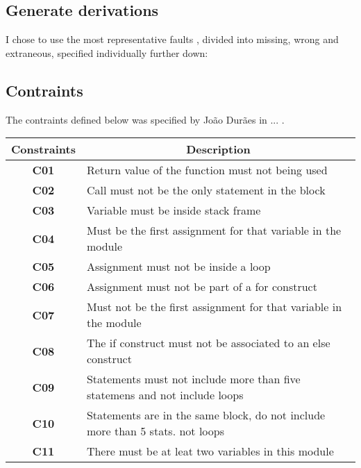 \subsection{Generate derivations}

I chose to use the most representative faults \cite{duraes2006emulation}, divided into missing, wrong and extraneous, specified individually further down:

\subsection{Contraints}

The contraints defined below was specified by João Durães in ... .

\begin{table}[h]
\begin{tabular}{|c|l|}
\hline
\textbf{Constraints}            & \multicolumn{1}{c|}{\textbf{Description}}                                     \\ \hline
\textbf{C01}       \label{C01}  & Return value of the function must not being used                              \\ \hline
\textbf{C02}       \label{C02}  & Call must not be the only statement in the block                              \\ \hline
\textbf{C03}       \label{C03}  & Variable must be inside stack frame                                           \\ \hline
\textbf{C04}       \label{C04}  & Must be the first assignment for that variable in the module                  \\ \hline
\textbf{C05}       \label{C05}  & Assignment must not be inside a loop                                          \\ \hline
\textbf{C06}       \label{C06}  & Assignment must not be part of a for construct                                \\ \hline
\textbf{C07}       \label{C07}  & Must not be the first assignment for that variable in the module              \\ \hline
\textbf{C08}       \label{C08}  & The if construct must not be associated to an else construct                  \\ \hline
\textbf{C09}       \label{C09}  & Statements must not include more than five statemens and not include loops    \\ \hline
\textbf{C10}       \label{C010} & Statements are in the same block, do not include more than 5 stats. not loops \\ \hline
\textbf{C11}       \label{C011} & There must be at leat two variables in this module                            \\ \hline
\end{tabular}
\end{table}

